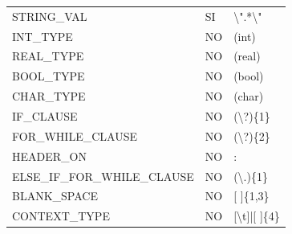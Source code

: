 \documentclass[11pt, english]{article}
\begin{document}
\begin{table}[H]
\begin{tabular}{l|l|l}
		STRING\_VAL                                              & SI                                                                   & \textbackslash{}".*\textbackslash{}"                                \\
		INT\_TYPE                                                & NO                                                                   & (int)                                                               \\
		REAL\_TYPE                                               & NO                                                                   & (real)                                                              \\
		BOOL\_TYPE                                               & NO                                                                   & (bool)                                                              \\
		CHAR\_TYPE                                               & NO                                                                   & (char)                                                              \\
		IF\_CLAUSE                                               & NO                                                                   & (\textbackslash{}?)\{1\}                                            \\
		FOR\_WHILE\_CLAUSE                                       & NO                                                                   & (\textbackslash{}?)\{2\}                                            \\
		HEADER\_ON                                               & NO                                                                   & :                                                                   \\
		ELSE\_IF\_FOR\_WHILE\_CLAUSE                             & NO                                                                   & (\textbackslash{}.)\{1\}                                            \\
		BLANK\_SPACE                                             & NO                                                                   & {[} {]}\{1,3\}                                                      \\
		CONTEXT\_TYPE                                            & NO                                                                   & {[}\textbackslash{}t{]}|{[} {]}\{4\}                                \\

\end{tabular}
\end{table}
\end{document}
